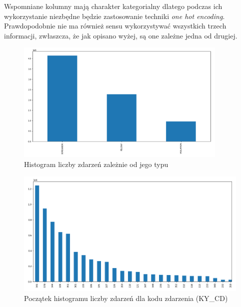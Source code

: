 \documentclass{classrep}
\begin{document}
{{{                Wspomniane kolumny mają charakter kategorialny dlatego podczas ich
                wykorzystanie niezbędne będzie zastosowanie techniki \emph{one hot
                encoding}. Prawdopodobnie nie ma również sensu wykorzystywać wszystkich
                trzech informacji, zwłaszcza, że jak opisano wyżej, są one zależne
                jedna od drugiej.
                
                \begin{figure}[!htbp]
                    \centering
                    \includegraphics[width=0.9\textwidth]{img/hist_law_cat_cd.png}
                    \caption{Histogram liczby zdarzeń zależnie od jego typu}
                    \label{hist_law_breaking_level}
                \end{figure}
                \begin{figure}[!htbp]
                    \centering
                    \includegraphics[width=\textwidth]{img/hist_ky_cd.png}
                    \caption{Początek histogramu liczby zdarzeń dla kodu zdarzenia (KY\_CD)}
                    \label{hist_ky_cd}
                \end{figure}
                \begin{figure}[!htbp]

\end{figure}}}}
\end{document}
